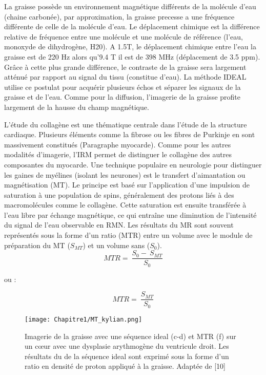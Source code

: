 La graisse possède un environnement magnétique différents de la molécule d’eau (chaine carbonée), par approximation, la graisse precesse a une fréquence différente de celle de la molécule d’eau. Le déplacement chimique est la différence relative de fréquence entre une molécule et une molécule de référence (l’eau, monoxyde de dihydrogène, H20). A 1.5T, le déplacement chimique entre l’eau la graisse est de 220 Hz alors qu’9.4 T il est de 398 MHz (déplacement de 3.5 ppm). Grâce à cette plus grande différence, le contraste de la graisse sera largement atténué par rapport au signal du tissu (constitue d’eau). La méthode IDEAL \cite{Haliot2021} utilise ce postulat pour acquérir plusieurs échos et séparer les signaux de la graisse et de l’eau. Comme pour la diffusion, l’imagerie de la graisse profite largement de la hausse du champ magnétique.

L’étude du collagène est une thématique centrale dans l’étude de la structure cardiaque. Plusieurs éléments comme la fibrose ou les fibres de Purkinje en sont massivement constitués (Paragraphe myocarde). Comme pour les autres modalités d’imagerie, l’IRM permet de distinguer le collagène des autres composantes du myocarde. Une technique populaire en neurologie pour distinguer les gaines de myélines (isolant les neurones) est le transfert d’aimantation ou magnétisation (MT). Le principe est basé sur l'application d'une impulsion de saturation à une population de spins, généralement des protons liés à des macromolécules comme le collagène. Cette saturation est ensuite transférée à l'eau libre par échange magnétique, ce qui entraîne une diminution de l'intensité du signal de l'eau observable en RMN. Les résultats du MR sont souvent représentés sous la forme d’un ratio (MTR) entre un volume avec le module de préparation du MT  ($S_{MT}$) et un volume sans ($S_0$).
\begin{equation}
\nonumber
MTR=\ \frac{S_0-\ S_{MT}}{S_0}
\end{equation}

ou \cite{Haliot2021} :

\begin{equation}
\nonumber
MTR=\ \frac{S_{MT}}{S_0}
\end{equation}


\begin{figure}[!htbp]
  \begin{center}
    \texttt{[image: Chapitre1/MT\_kylian.png]}
     \end{center}
    \caption{Imagerie de la graisse avec une séquence ideal (c-d) et MTR (f) sur un cœur avec une dysplasie arythmogène du ventricule droit. Les résultats du de la séquence ideal sont exprimé sous la forme d’un ratio en densité de proton appliqué à la graisse. Adaptée de [10]}
  \label{fig:IRM_exvivo_MT}
\end{figure}

